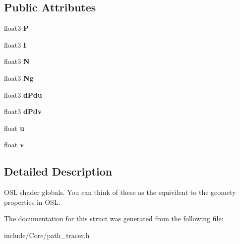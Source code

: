 \subsection*{Public Attributes}
\begin{DoxyCompactItemize}
\item 
\hypertarget{struct_shader_globals_ad9fba528618147f3895c1e507cc955f4}{float3 {\bfseries P}}\label{struct_shader_globals_ad9fba528618147f3895c1e507cc955f4}

\item 
\hypertarget{struct_shader_globals_a883904ea32d7167fbcb4e860877dba76}{float3 {\bfseries I}}\label{struct_shader_globals_a883904ea32d7167fbcb4e860877dba76}

\item 
\hypertarget{struct_shader_globals_add1c7b8c92055a839d8a3743a552e228}{float3 {\bfseries N}}\label{struct_shader_globals_add1c7b8c92055a839d8a3743a552e228}

\item 
\hypertarget{struct_shader_globals_a24bc28c3146dadd65ae5a20f9c82853e}{float3 {\bfseries Ng}}\label{struct_shader_globals_a24bc28c3146dadd65ae5a20f9c82853e}

\item 
\hypertarget{struct_shader_globals_a21322eb85ee46bb6ed75893f1a4fcf53}{float3 {\bfseries d\-Pdu}}\label{struct_shader_globals_a21322eb85ee46bb6ed75893f1a4fcf53}

\item 
\hypertarget{struct_shader_globals_ab19e823635ae32b2e3ad1d5104444bee}{float3 {\bfseries d\-Pdv}}\label{struct_shader_globals_ab19e823635ae32b2e3ad1d5104444bee}

\item 
\hypertarget{struct_shader_globals_a15d2ea9eaaf364d8825ff77650bea8b5}{float {\bfseries u}}\label{struct_shader_globals_a15d2ea9eaaf364d8825ff77650bea8b5}

\item 
\hypertarget{struct_shader_globals_ae043a247a659f1fd7ecb8ddf4579e596}{float {\bfseries v}}\label{struct_shader_globals_ae043a247a659f1fd7ecb8ddf4579e596}

\end{DoxyCompactItemize}


\subsection{Detailed Description}
O\-S\-L shader globals. You can think of these as the equivilent to the geomety properties in O\-S\-L. 

The documentation for this struct was generated from the following file\-:\begin{DoxyCompactItemize}
\item 
include/\-Core/path\-\_\-tracer.\-h\end{DoxyCompactItemize}
